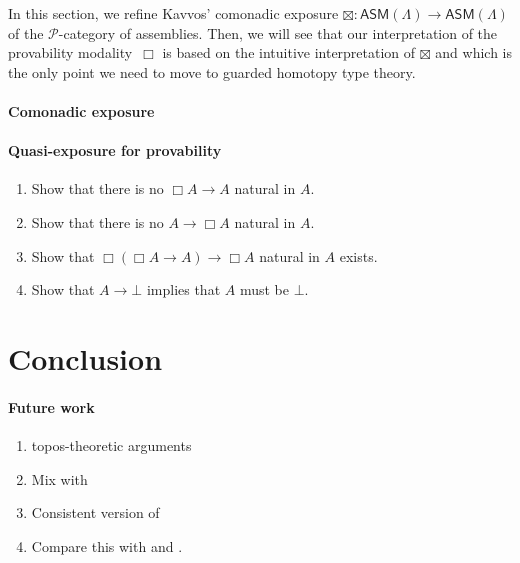 \documentclass[a4paper,UKenglish,numberwithinsect,cleveref,thm-restate]{lipics-v2021}
\newcommand{\PP}{\mathscr{P}}
\newcommand{\ASM}{\mathsf{ASM}}
\theoremstyle{plain}
\begin{document}
In this section, we refine Kavvos' comonadic exposure $\boxtimes : \ASM(\Lambda) \to \ASM(\Lambda)$ of the $\PP$-category of assemblies.
Then, we will see that our interpretation of the provability modality~$\Box$ is based on the intuitive interpretation of $\boxtimes$ and which is the only point we need to move to guarded homotopy type theory.

\paragraph*{Comonadic exposure}

\paragraph*{Quasi-exposure for provability}

\begin{enumerate}
  \item Show that there is no $\Box A \to A$ natural in $A$.
  \item Show that there is no $A \to \Box A$ natural in $A$.
  \item Show that $\Box (\Box A \to A) \to \Box A$ natural in $A$ exists.
  \item Show that $A \to \bot$ implies that $A$ must be $\bot$.
\end{enumerate}

\cite{Mogelberg2019a,Veltri2020}

\section{Conclusion}\label{sec:conclusion}
\paragraph*{Future work}
\begin{enumerate}
  \item topos-theoretic arguments
  \item Mix with \cite{Kavvos2017b}
  \item Consistent version of \cite{Kavvos2017b}
  \item Compare this with \cite{Shamkanov2014} and \cite{Shamkanov2016a}.
\end{enumerate}
\cite{Davies2001b}



\end{document}
